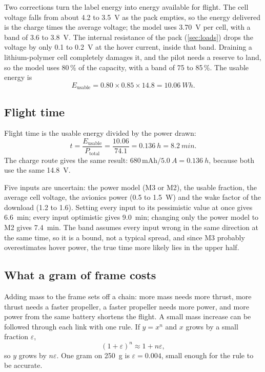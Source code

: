 Two corrections turn the label energy into energy available for flight. The cell voltage falls from about 4.2 to \SI{3.5}{V} as the pack empties, so the energy delivered is the charge times the average voltage; the model uses \SI{3.70}{V} per cell, with a band of 3.6 to \SI{3.8}{V}. The internal resistance of the pack (\cref{sec:loads}) drops the voltage by only 0.1 to \SI{0.2}{V} at the hover current, inside that band. Draining a lithium-polymer cell completely damages it, and the pilot needs a reserve to land, so the model uses 80\,\% of the capacity, with a band of 75 to 85\,\%. The usable energy is
\begin{equation}
E_\text{usable} = 0.80 \times 0.85 \times 14.8 = \SI{10.06}{Wh}.
\end{equation}

\subsection{Flight time}

Flight time is the usable energy divided by the power drawn:
\begin{equation}
t = \frac{E_\text{usable}}{P_\text{total}} = \frac{10.06}{74.1} = \SI{0.136}{h} = \SI{8.2}{min}.
\end{equation}
The charge route gives the same result: $680\,\text{mAh} / \SI{5.0}{A} = \SI{0.136}{h}$, because both use the same \SI{14.8}{V}.

Five inputs are uncertain: the power model (M3 or M2), the usable fraction, the average cell voltage, the avionics power (0.5 to \SI{1.5}{W}) and the wake factor of the download (1.2 to 1.6). Setting every input to its pessimistic value at once gives \SI{6.6}{min}; every input optimistic gives \SI{9.0}{min}; changing only the power model to M2 gives \SI{7.4}{min}. The band assumes every input wrong in the same direction at the same time, so it is a bound, not a typical spread, and since M3 probably overestimates hover power, the true time more likely lies in the upper half.

\subsection{What a gram of frame costs}\label{sec:sizing-gram}

Adding mass to the frame sets off a chain: more mass needs more thrust, more thrust needs a faster propeller, a faster propeller needs more power, and more power from the same battery shortens the flight. A small mass increase can be followed through each link with one rule. If $y = x^n$ and $x$ grows by a small fraction $\varepsilon$,
\begin{equation}
(1+\varepsilon)^n \approx 1 + n\varepsilon,
\end{equation}
so $y$ grows by $n\varepsilon$. One gram on \SI{250}{g} is $\varepsilon = 0.004$, small enough for the rule to be accurate.

